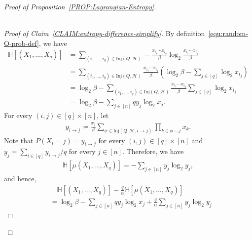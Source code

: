 \documentclass[10pt,a4paper]{amsart}
\begin{document}
\begin{proof}[Proof of Proposition~\ref{PROP:Lagrangian-Entropy}]
\begin{claim}
\begin{align*}
        \end{align*}
    \end{claim}
    \begin{proof}[Proof of Claim~\ref{CLAIM:entropy-difference-simplify}]
        By definition~\eqref{equ:random-Q-prob-def}, we have 
        \begin{align*}
            \mathbb{H}[(X_1, \ldots, X_{q})]
            & = \sum_{(i_1, \ldots, i_{q}) \in \mathrm{Inj}(Q,\mathcal{H})} - \frac{x_{i_1} \cdots x_{i_q}}{\beta} \log_{2} \frac{x_{i_1} \cdots x_{i_q}}{\beta} \\
            & = \sum_{(i_1, \ldots, i_{q}) \in \mathrm{Inj}(Q,\mathcal{H})} \frac{x_{i_1} \cdots x_{i_q}}{\beta} \left( \log_{2} \beta - \sum_{j\in [q]} \log_{2}x_{i_j} \right) \\
            & = \log_{2}\beta - \sum_{(i_1, \ldots, i_{q}) \in \mathrm{Inj}(Q,\mathcal{H})} \frac{x_{i_1} \cdots x_{i_q}}{\beta} \sum_{j\in [q]} \log_{2}x_{i_j} \\
            & = \log_{2}\beta - \sum_{j\in [n]} q y_{j} \log_{2} x_j. 
        \end{align*}
        For every $(i,j) \in [q] \times [n]$, let 
        \begin{align*}
             y_{i \to j}
            \coloneqq \frac{x_j}{\beta} \sum_{\phi \in \mathrm{Inj}(Q,\mathcal{H}, i \to j)} \prod_{k\in \phi - j} x_k. 
        \end{align*}
        Note that $P(X_i = j) = y_{i \to j}$ for every $(i,j) \in [q] \times [n]$ and $y_j = \sum_{i \in [q]}y_{i\to j}/q$ for every $j \in [n]$. 
        Therefore, we have 
        \begin{align*}
            \mathbb{H}[\mu(X_{1}, \ldots, X_q)]
            = - \sum_{j \in [n]} y_j \log_2 y_j, 
        \end{align*}
        and hence, 
        \begin{align*}
            & \quad \mathbb{H}\left[ (X_1, \ldots, X_{q}) \right] - \frac{q}{\alpha}  \mathbb{H}[\mu(X_{1}, \ldots, X_q)] \\
            & = \log_{2}\beta - \sum_{j\in [n]} q y_{j} \log_{2} x_j + \frac{q}{\alpha}\sum_{j \in [n]} y_j \log_2 y_j 

\end{align*}
\end{proof}
\end{proof}
\end{document}
